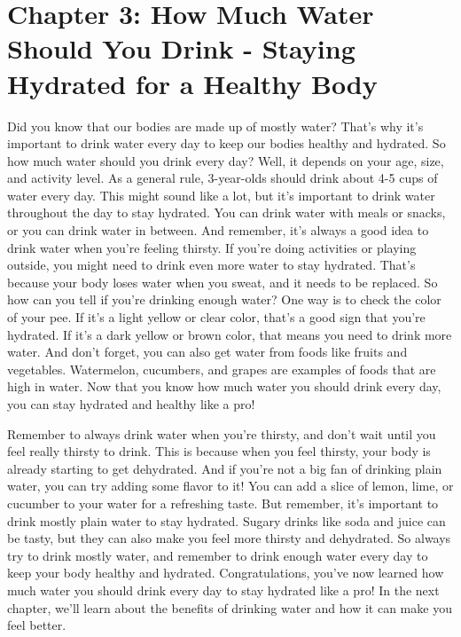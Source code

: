 \chapter{Chapter 3: How Much Water Should You Drink - Staying Hydrated for a Healthy Body
}
Did you know that our bodies are made up of mostly
water? That's why it's important to drink water every day to keep our bodies
healthy and hydrated.
So how much water should you drink every day? Well, it
depends on your age, size, and activity level.
As a general rule, 3-year-olds should drink about 4-5
cups of water every day. This might sound like a lot, but it's important to
drink water throughout the day to stay hydrated.
You can drink water with meals or snacks, or you can
drink water in between. And remember, it's always a good idea to drink water
when you're feeling thirsty.
If you're doing activities or playing outside, you
might need to drink even more water to stay hydrated. That's because your body
loses water when you sweat, and it needs to be replaced.
So how can you tell if you're drinking enough water?
One way is to check the color of your pee. If it's a light yellow or clear
color, that's a good sign that you're hydrated. If it's a dark yellow or brown
color, that means you need to drink more water.
And don't forget, you can also get water from foods
like fruits and vegetables. Watermelon, cucumbers, and grapes are examples of
foods that are high in water.
Now that you know how much water you should drink
every day, you can stay hydrated and healthy like a pro!
 
Remember to always drink water when you're thirsty, and don't wait until you feel really thirsty to drink. This is because when you feel thirsty, your body is already starting to get dehydrated.
And if you're not a big fan of drinking plain water,
you can try adding some flavor to it! You can add a slice of lemon, lime, or
cucumber to your water for a refreshing taste.
But remember, it's important to drink mostly plain
water to stay hydrated. Sugary drinks like soda and juice can be tasty, but
they can also make you feel more thirsty and dehydrated.
So always try to drink mostly water, and remember to
drink enough water every day to keep your body healthy and hydrated.
Congratulations, you've now learned how much water you
should drink every day to stay hydrated like a pro! In the next chapter, we'll
learn about the benefits of drinking water and how it can make you feel better.
